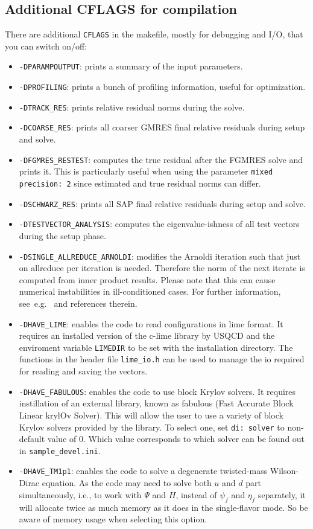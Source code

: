 \documentclass[a4paper,12pt]{scrartcl}
\begin{document}
\subsection{Additional CFLAGS for compilation} \label{additionalcflags}
There are additional \texttt{CFLAGS} in the makefile, mostly for debugging and I/O, that you can switch on/off:
\begin{itemize}
  \item \texttt{-DPARAMPOUTPUT}: prints a summary of the input parameters.
  \item \texttt{-DPROFILING}: prints a bunch of profiling information, useful for optimization.
  \item \texttt{-DTRACK\_RES}: prints relative residual norms during the solve. 
  \item \texttt{-DCOARSE\_RES}: prints all coarser GMRES final relative residuals during setup and solve.
  \item \texttt{-DFGMRES\_RESTEST}: computes the true residual after the FGMRES solve and prints it. This is particularly useful when using the parameter \texttt{mixed precision:~2} since estimated and true residual norms can differ.
  \item \texttt{-DSCHWARZ\_RES}: prints all SAP final relative residuals during setup and solve.
  \item \texttt{-DTESTVECTOR\_ANALYSIS}: computes the eigenvalue-ishness of all test vectors during the setup phase.
  \item \texttt{-DSINGLE\_ALLREDUCE\_ARNOLDI}: modifies the Arnoldi iteration such that just on allreduce per iteration is needed. Therefore the norm of the next iterate is computed from inner product results. Please note that this can cause numerical instabilities in ill-conditioned cases. For further information, see~e.g.~\cite{RottmannPhD} and references therein.
  \item \texttt{-DHAVE\_LIME}: enables the code to read configurations in lime format. It requires an installed version of the c-lime library by USQCD and the enviroment variable \texttt{LIMEDIR} to be set with the installation directory. The functions in the header file \texttt{lime\_io.h} can be used to manage the io required for reading and saving the vectors.
  \item \texttt{-DHAVE\_FABULOUS}: enables the code to use block Krylov solvers.  It requires instillation of an external library, known as fabulous (Fast Accurate Block Linear krylOv Solver).  This will allow the user to use a variety of block Krylov solvers provided by the library.  To select one, set \texttt{di:~solver} to non-default value of 0.  Which value corresponds to which solver can be found out in \texttt{sample\_devel.ini}.
  \item \texttt{-DHAVE\_TM1p1}: enables the code to solve a degenerate twisted-mass Wilson-Dirac equation.  As the code may need to solve both $u$ and $d$ part simultaneously, i.e., to work with $\Psi$ and $H$, instead of $\psi_f$ and $\eta_f$ separately, it will allocate twice as much memory as it does in the single-flavor mode.  So be aware of memory usage when selecting this option.
\end{itemize}
\end{document}
